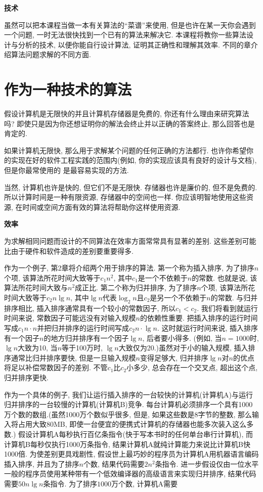 \documentclass[oneside,10pt,fontset=none]{ctexbook}
\numberwithin{definition}{chapter}
\numberwithin{theorem}{chapter}
\numberwithin{proof}{chapter}
\begin{document}
\textbf{技术}

虽然可以把本课程当做一本有关算法的``菜谱''来使用, 但是也许在某一天你会遇到一个问题, 一时无法很快找到一个已有的算法来解决它. 本课程将教你一些算法设计与分析的技术, 以便你能自行设计算法, 证明其正确性和理解其效率. 不同的章介绍算法问题求解的不同方面.

\section{作为一种技术的算法}

假设计算机是无限快的并且计算机存储器是免费的, 你还有什么理由来研究算法吗? 即使只是因为你还想证明你的解法会终止并以正确的答案终止, 那么回答也是肯定的.

如果计算机无限快, 那么用于求解某个问题的任何正确的方法都行. 也许你希望你的实现在好的软件工程实践的范围内(例如, 你的实现应该具有良好的设计与文档), 但是你最常使用的
是最容易实现的方法.

当然, 计算机也许是快的, 但它们不是无限快. 存储器也许是廉价的, 但不是免费的. 所以计算时间是一种有限资源, 存储器中的空间也一样. 你应该明智地使用这些资源, 在时间或空间方面有效的算法将帮助你这样使用资源.

\textbf{效率}

为求解相同问题而设计的不同算法在效率方面常常具有显著的差别. 这些差别可能比由于硬件和软件造成的差别要重要得多.

作为一个例子, 第2章将介绍两个用于排序的算法. 第一个称为插入排序, 为了排序$n$个项, 该算法所花时间大致等于$c_1n^2$, 其中$c_1$是一个不依赖于$n$的常数. 也就是说, 该算法所花时间大致与$n^2$成正比. 第二个称为归并排序, 为了排序$n$个项, 该算法所花时间大致等于$c_2n\lg{n}$, 其中$\lg{n}$代表$\log_2n$且$c_2$是另一个不依赖于$n$的常数. 与归并排序相比, 插入排序通常具有一个较小的常数因子, 所以$c_1<c_2$. 我们将看到就运行时间来说, 常数因子可能远没有对输入规模$n$的依赖性重要. 把插入排序的运行时间写成$c_1n\cdot n$并把归并排序的运行时间写成$c_2n\cdot \lg{n}$. 这时就运行时间来说, 插入排序有一个因子$n$的地方归并排序有一个因子$\lg{n}$, 后者要小得多. (例如, 当$n=1000$时, $\lg{n}$大致为10, 当$n$等于100万时, $\lg{n}$大致仅为20.)虽然对于小的输入规模, 插入排序通常比归并排序要快, 但是一旦输入规模$n$变得足够大, 归并排序$\lg{n}$对$n$的优点将足以补偿常数因子的差别. 不管$c_1$比$c_2$小多少, 总会存在一个交叉点, 超出这个点, 归并排序更快.

作为一个具体的例子, 我们让运行插入排序的一台较快的计算机(计算机A)与运行归并排序的一台较慢的计算机(计算机B)竞争. 每台计算机必须排序一个具有1000万个数的数组.(虽然1000万个数似乎很多, 但是, 如果这些数是8字节的整数, 那么输入将占用大致80MB, 即使一台便宜的便携式计算机的存储器也能多次装入这么多数.) 假设计算机A每秒执行百亿条指令(快于写本书时的任何单台串行计算机), 而计算机B每秒仅执行1000万条指令, 结果计算机A就纯计算能力来说比计算机B快1000倍. 为使差别更具戏剧性, 假设世上最巧妙的程序员为计算机A用机器语言编码插入排序, 并且为了排序$n$个数, 结果代码需要$2n^2$条指令. 进一步假设仅由一位水平一般的程序员使用某种带有一个低效编译器的高级语言来实现归并排序, 结果代码需要$50n\lg{n}$条指令. 为了排序$1000$万个数, 计算机A需要
\end{document}
